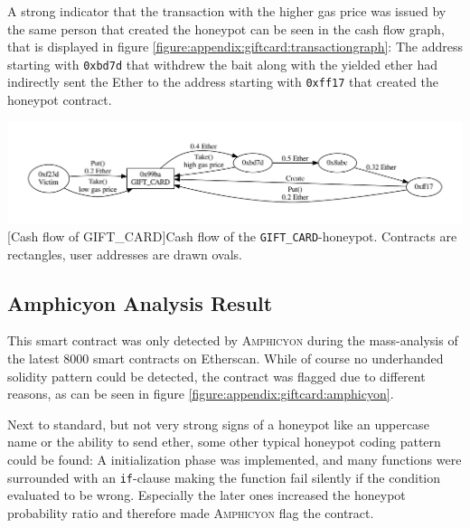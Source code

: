 A strong indicator that the transaction with the higher gas price was issued by the same person that created the honeypot can be seen in the cash flow graph, that is displayed in figure \ref{figure:appendix:giftcard:transactiongraph}: The address starting with \texttt{0xbd7d} that withdrew the bait along with the yielded ether had indirectly sent the Ether to the address starting with \texttt{0xff17} that created the honeypot contract.

\vspace{1em}
\begin{minipage}{\linewidth}
	\centering
	\includegraphics[width=14cm]{img/giftcard/cashflowgraph.pdf}
	[Cash flow of GIFT_CARD]{Cash flow of the \texttt{GIFT_CARD}-honeypot. Contracts are rectangles, user addresses are drawn ovals.}
	\label{figure:appendix:giftcard:transactiongraph}
\end{minipage}

\subsection{Amphicyon Analysis Result}
This smart contract was only detected by \textsc{Amphicyon} during the mass-analysis of the latest 8000 smart contracts on Etherscan. While of course no underhanded solidity pattern could be detected, the contract was flagged due to different reasons, as can be seen in figure \ref{figure:appendix:giftcard:amphicyon}.

Next to standard, but not very strong signs of a honeypot like an uppercase name or the ability to send ether, some other typical honeypot coding pattern could be found: A initialization phase was implemented, and many functions were surrounded with an \texttt{if}-clause making the function fail silently if the condition evaluated to be wrong. Especially the later ones increased the honeypot probability ratio and therefore made \textsc{Amphicyon} flag the contract.

